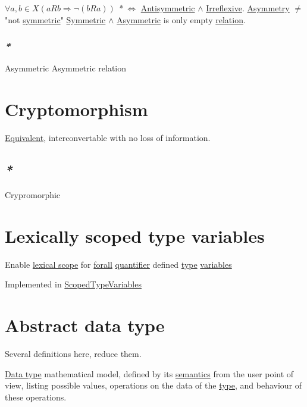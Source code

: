 \documentclass[a4paper,14pt,oneside]{book}
\begin{document}
\(\forall a,b \in X (aRb \Rightarrow \neg (bRa))\)
\emph{*} \(\iff\) \hyperref[org8b9d873]{Antisymmetric} \(\land\) \hyperref[org69f02e4]{Irreflexive}.
\hyperref[orgaef3da7]{Asymmetry} \(\ne\) "not \hyperref[orgfc61b53]{symmetric}"
\hyperref[orgfc61b53]{Symmetric} \(\land\) \hyperref[orgc7b4c96]{Asymmetric} is only empty \hyperref[org9291137]{relation}.

\subsection{\emph{*}}
\label{sec:orgbbea443}

\label{orgc7b4c96}Asymmetric
\label{orgdc91eb3}Asymmetric relation

\chapter{\label{org74aa1ff}Cryptomorphism}
\label{sec:orgd70176a}

\hyperref[org8e55d93]{Equivalent}, interconvertable with no loss of information.

\section{\emph{*}}
\label{sec:orge8aa2c9}

\label{org7887dff}Crypromorphic

\chapter{\label{orgdc58f6c}Lexically scoped type variables}
\label{sec:org06e65f8}

Enable \hyperref[org71d9536]{lexical scope} for \hyperref[org2846382]{forall} \hyperref[orgd404adf]{quantifier} defined \hyperref[org99e5c3b]{type} \hyperref[orgea860d1]{variables}

Implemented in \hyperref[org1acf03a]{ScopedTypeVariables}

\chapter{\label{orgb08c752}Abstract data type}
\label{sec:org6a38d20}

Several definitions here, reduce them.

\hyperref[org996e822]{Data type} mathematical model, defined by its \hyperref[org49c6205]{semantics} from the user point of view, listing possible values, operations on the data of the \hyperref[org99e5c3b]{type}, and behaviour of these operations.
\end{document}
